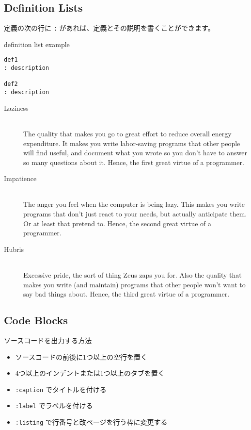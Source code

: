 \documentclass[a4j, titlepage]{jarticle}
\begin{document}
\fi
\subsection{Definition Lists}

定義の次の行に {\tt :} があれば、定義とその説明を書くことができます。

\begin{itembox}[c]{definition list example}
\begin{verbatim}
def1
: description

def2
: description
\end{verbatim}
\end{itembox}

\begin{description}
\item[Laziness]\mbox{}\\ The quality that makes you go to great effort to reduce overall energy expenditure. It makes you write labor-saving programs that other people will find useful, and document what you wrote so you don't have to answer so many questions about it. Hence, the first great virtue of a programmer.



\item[Impatience]\mbox{}\\ The anger you feel when the computer is being lazy. This makes you write programs that don't just react to your needs, but actually anticipate them. Or at least that pretend to. Hence, the second great virtue of a programmer.



\item[Hubris]\mbox{}\\ Excessive pride, the sort of thing Zeus zaps you for. Also the quality that makes you write (and maintain) programs that other people won't want to say bad things about. Hence, the third great virtue of a programmer.
\end{description}

\subsection{Code Blocks}

ソースコードを出力する方法

\begin{itemize}
\item ソースコードの前後に1つ以上の空行を置く
\item 4つ以上のインデントまたは1つ以上のタブを置く
\item {\tt :caption} でタイトルを付ける
\item {\tt :label} でラベルを付ける
\item {\tt :listing} で行番号と改ページを行う枠に変更する
\end{itemize}
\end{document}
